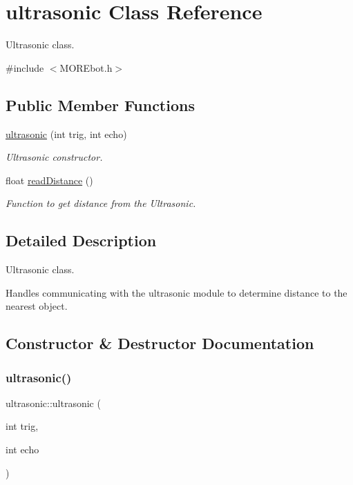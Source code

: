 \hypertarget{classultrasonic}{}\section{ultrasonic Class Reference}
\label{classultrasonic}


Ultrasonic class.  




{\ttfamily \#include $<$M\+O\+R\+Ebot.\+h$>$}

\subsection*{Public Member Functions}
\begin{DoxyCompactItemize}
\item 
\mbox{\hyperlink{classultrasonic_a28f8c308f64c7a7bf1f94a89bd0ccee9}{ultrasonic}} (int trig, int echo)
\begin{DoxyCompactList}\small\item\em Ultrasonic constructor. \end{DoxyCompactList}\item 
float \mbox{\hyperlink{classultrasonic_aed6e493e6585def02c351e04bab3e496}{read\+Distance}} ()
\begin{DoxyCompactList}\small\item\em Function to get distance from the Ultrasonic. \end{DoxyCompactList}\end{DoxyCompactItemize}


\subsection{Detailed Description}
Ultrasonic class. 

Handles communicating with the ultrasonic module to determine distance to the nearest object. 

\subsection{Constructor \& Destructor Documentation}
\mbox{\label{classultrasonic_a28f8c308f64c7a7bf1f94a89bd0ccee9}} 
\subsubsection{\texorpdfstring{ultrasonic()}{ultrasonic()}}
{\footnotesize\ttfamily ultrasonic\+::ultrasonic (\begin{DoxyParamCaption}\item[{int}]{trig,  }\item[{int}]{echo }\end{DoxyParamCaption})}



